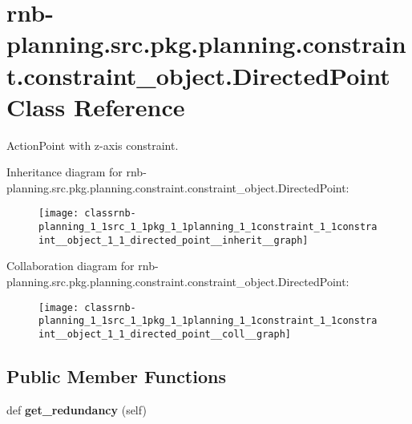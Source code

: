 \hypertarget{classrnb-planning_1_1src_1_1pkg_1_1planning_1_1constraint_1_1constraint__object_1_1_directed_point}{}\section{rnb-\/planning.src.\+pkg.\+planning.\+constraint.\+constraint\+\_\+object.\+Directed\+Point Class Reference}
\label{classrnb-planning_1_1src_1_1pkg_1_1planning_1_1constraint_1_1constraint__object_1_1_directed_point}


Action\+Point with z-\/axis constraint.  




Inheritance diagram for rnb-\/planning.src.\+pkg.\+planning.\+constraint.\+constraint\+\_\+object.\+Directed\+Point\+:\nopagebreak
\begin{figure}[H]
\begin{center}
\leavevmode
\texttt{[image: classrnb-planning\_1\_1src\_1\_1pkg\_1\_1planning\_1\_1constraint\_1\_1constraint\_\_object\_1\_1\_directed\_point\_\_inherit\_\_graph]}
\end{center}
\end{figure}


Collaboration diagram for rnb-\/planning.src.\+pkg.\+planning.\+constraint.\+constraint\+\_\+object.\+Directed\+Point\+:\nopagebreak
\begin{figure}[H]
\begin{center}
\leavevmode
\texttt{[image: classrnb-planning\_1\_1src\_1\_1pkg\_1\_1planning\_1\_1constraint\_1\_1constraint\_\_object\_1\_1\_directed\_point\_\_coll\_\_graph]}
\end{center}
\end{figure}
\subsection*{Public Member Functions}
\begin{DoxyCompactItemize}
\item 
\mbox{\label{classrnb-planning_1_1src_1_1pkg_1_1planning_1_1constraint_1_1constraint__object_1_1_directed_point_abe2591231bd5936820be604861db4aac}} 
def {\bfseries get\+\_\+redundancy} (self)
\end{DoxyCompactItemize}
